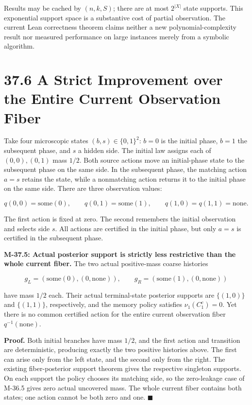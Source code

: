 \documentclass[
  english,
  11pt,
  oneside]{book}
\newcounter{none} %
\begin{document}
Results may be cached by \((n,k,S)\); there are at most \(2^{|X|}\) state supports. This exponential support space is a substantive cost of partial observation. The current Lean correctness theorem claims neither a new polynomial-complexity result nor measured performance on large instances merely from a symbolic algorithm.

\section{37.6 A Strict Improvement over the Entire Current Observation Fiber}\label{a-strict-improvement-over-the-entire-current-observation-fiber}

Take four microscopic states \((b,s)\in\{0,1\}^2\): \(b=0\) is the initial phase, \(b=1\) the subsequent phase, and \(s\) a hidden side. The initial law assigns each of \((0,0),(0,1)\) mass \(1/2\). Both source actions move an initial-phase state to the subsequent phase on the same side. In the subsequent phase, the matching action \(a=s\) retains the state, while a nonmatching action returns it to the initial phase on the same side. There are three observation values:

\[q(0,0)=\mathrm{some}(0),\qquad
q(0,1)=\mathrm{some}(1),\qquad
q(1,0)=q(1,1)=\mathrm{none}.\]

The first action is fixed at zero. The second remembers the initial observation and selects side \(s\). All actions are certified in the initial phase, but only \(a=s\) is certified in the subsequent phase.

\hypertarget{m-37-5}{}\label{m-37-5}

\textbf{M-37.5: Actual posterior support is strictly less restrictive than the whole current fiber.} The two actual positive-mass coarse histories

\[g_L=(\mathrm{some}(0),(0,\mathrm{none})),\qquad
g_R=(\mathrm{some}(1),(0,\mathrm{none}))\]

have mass \(1/2\) each. Their actual terminal-state posterior supports are \(\{(1,0)\}\) and \(\{(1,1)\}\), respectively, and the memory policy satisfies \(\nu_1(C_1^c)=0\). Yet there is no common certified action for the entire current observation fiber \(q^{-1}(\mathrm{none})\).

\textbf{Proof.} Both initial branches have mass \(1/2\), and the first action and transition are deterministic, producing exactly the two positive histories above. The first can arise only from the left state, and the second only from the right. The existing fiber-posterior support theorem gives the respective singleton supports. On each support the policy chooses its matching side, so the zero-leakage case of M-36.5 gives zero actual uncovered mass. The whole current fiber contains both states; one action cannot be both zero and one. \(\blacksquare\)
\end{document}
